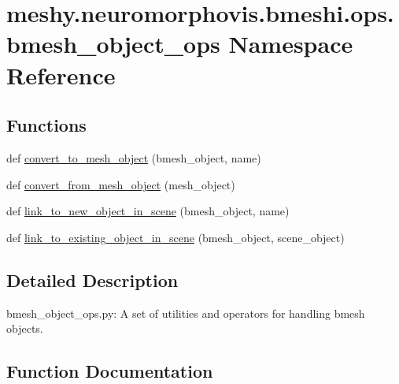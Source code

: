 \hypertarget{namespacemeshy_1_1neuromorphovis_1_1bmeshi_1_1ops_1_1bmesh__object__ops}{}\section{meshy.\+neuromorphovis.\+bmeshi.\+ops.\+bmesh\+\_\+object\+\_\+ops Namespace Reference}
\label{namespacemeshy_1_1neuromorphovis_1_1bmeshi_1_1ops_1_1bmesh__object__ops}
\subsection*{Functions}
\begin{DoxyCompactItemize}
\item 
def \hyperlink{namespacemeshy_1_1neuromorphovis_1_1bmeshi_1_1ops_1_1bmesh__object__ops_a590f080dde2a3e22fbb6dc68a45537dd}{convert\+\_\+to\+\_\+mesh\+\_\+object} (bmesh\+\_\+object, name)
\item 
def \hyperlink{namespacemeshy_1_1neuromorphovis_1_1bmeshi_1_1ops_1_1bmesh__object__ops_acc52e632db05725b8b277cf1c5838961}{convert\+\_\+from\+\_\+mesh\+\_\+object} (mesh\+\_\+object)
\item 
def \hyperlink{namespacemeshy_1_1neuromorphovis_1_1bmeshi_1_1ops_1_1bmesh__object__ops_aea0035f9e83e6f43f0eb15b745d807fe}{link\+\_\+to\+\_\+new\+\_\+object\+\_\+in\+\_\+scene} (bmesh\+\_\+object, name)
\item 
def \hyperlink{namespacemeshy_1_1neuromorphovis_1_1bmeshi_1_1ops_1_1bmesh__object__ops_af1c9484a2c57dcb92a0411c7814290ce}{link\+\_\+to\+\_\+existing\+\_\+object\+\_\+in\+\_\+scene} (bmesh\+\_\+object, scene\+\_\+object)
\end{DoxyCompactItemize}


\subsection{Detailed Description}
\begin{DoxyVerb}bmesh_object_ops.py:
A set of utilities and operators for handling bmesh objects.
\end{DoxyVerb}
 

\subsection{Function Documentation}
